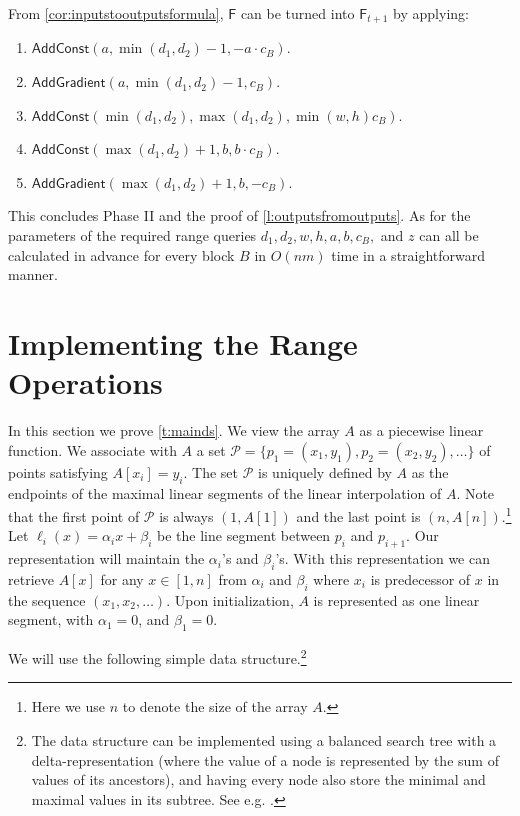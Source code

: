 \documentclass[10pt,a4paper]{article}
\newcommand{\F}{\mathsf{F}}
\newcommand{\AC}{\mathsf{AddConst}}
\newcommand{\AG}{\mathsf{AddGradient}}
\renewcommand{\P}{\mathcal{P}}
\begin{document}
\noindent From \cref{cor:inputstooutputsformula}, $\F$ can be turned into $\F_{t+1}$ by applying: 
\begin{enumerate}
    \item $\AC(a, \min(d_1,d_2) - 1, -a \cdot c_B)$.
    \item $\AG(a, \min(d_1,d_2) - 1, c_B)$.
    \item $\AC(\min(d_1,d_2),\max(d_1,d_2),\min(w,h)c_B)$.
    \item $\AC(\max(d_1,d_2) +1, b, b \cdot c_B)$.
    \item $\AG(\max(d_1,d_2) + 1, b , -c_B)$.
\end{enumerate}

This concludes Phase II and the proof of \cref{l:outputsfromoutputs}. 
As for the parameters of the required range queries $d_1,d_2,w,h,a,b,c_B,$ and $z$ can all be calculated in advance for every block $B$ in $O(nm)$ time in a straightforward manner.

\section{Implementing the Range Operations}\label{sec:IntervalDS}

In this section we prove \cref{t:mainds}.
We view the array $A$ as a piecewise linear function. 
We associate with $A$ a set $\P = \{p_1 = (x_1,y_1) ,p_2 = (x_2,y_2), \ldots\}$ of points satisfying $A[x_i]=y_i$. The set $\P$ is uniquely defined by $A$ as the endpoints of the maximal linear segments of the linear interpolation of $A$. Note that the first point of $\P$ is always $(1,A[1])$ and the last point is $(n,A[n])$.\footnote{Here we use $n$ to denote the size of the array $A$.} 
Let $\ell_i(x)=\alpha_ix+\beta_i$ be the line segment between $p_i$ and $p_{i+1}$. 
Our representation will maintain the $\alpha_i$'s and $\beta_i$'s.
With this representation we can retrieve $A[x]$ for any $x\in[1,n]$ from $\alpha_i$ and $\beta_i$ where $x_i$ is predecessor of $x$ in the sequence $(x_1, x_2, \ldots)$.
Upon initialization, $A$ is represented as one linear segment, with $\alpha_1 =0$, and $\beta_1=0$.

We will use the following simple data structure.\footnote{The data structure can be implemented using a balanced search tree with a delta-representation (where the value of a node is represented by the sum of values of its ancestors), and having every node also store the minimal and maximal values in its subtree. See e.g. \cite{PlanarBook}.}
\end{document}
